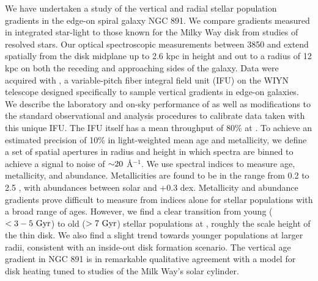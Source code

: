 \begin{chabstract}

  We have undertaken a study of the vertical and radial stellar
  population gradients in the edge-on spiral galaxy NGC 891. We
  compare gradients measured in integrated star-light to those known
  for the Milky Way disk from studies of resolved stars.  Our optical
  spectroscopic measurements between 3850 and  extend
  spatially from the disk midplane up to 2.6 kpc in height and out to
  a radius of 12 kpc on both the receding and approaching sides of the
  galaxy. Data were acquired with \GP, a variable-pitch fiber integral
  field unit (IFU) on the WIYN telescope designed specifically to
  sample vertical gradients in edge-on galaxies. We describe the
  laboratory and on-sky performance of \GP as well as modifications to
  the standard observational and analysis procedures to calibrate data
  taken with this unique IFU. The IFU itself has a mean throughput of
  80\% at . To achieve an estimated precision of 10\%
  in light-weighted mean age and metallicity, we define a set of
  spatial apertures in radius and height in which spectra are binned
  to achieve a signal to noise of ${\sim} 20$ \AA$^{-1}$. We use
  spectral indices to measure age, metallicity, and
  abundance. Metallicities are found to be in the range from 0.2 to
  2.5 \Zsol, with abundances between solar and +0.3 dex. Metallicity
  and abundance gradients prove difficult to measure from indices
  alone for stellar populations with a broad range of ages. However,
  we find a clear transition from young ($<3 - 5~\mathrm{Gyr} $) to old
  ($>7~\mathrm{Gyr} $) stellar populations at , roughly the
  scale height of the thin disk. We also find a slight trend towards
  younger populations at larger radii, consistent with an inside-out
  disk formation scenario.  The vertical age gradient in NGC 891 is in
  remarkable qualitative agreement with a model for disk heating tuned
  to studies of the Milk Way's solar cylinder.


\end{chabstract}
\cleardoublepage

